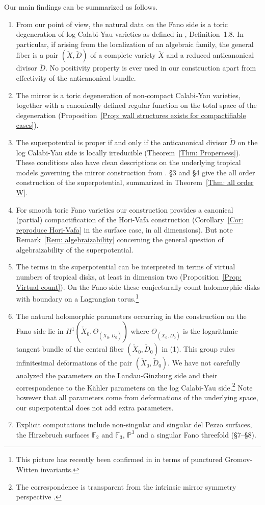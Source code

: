 \documentclass[11pt,letter]{amsart}
\theoremstyle{definition}
\theoremstyle{remark}
\numberwithin{equation}{section}
\numberwithin{figure}{section}
\newcommand{\FF} {\mathbb{F}}
\newcommand{\PP} {\mathbb{P}}
\begin{document}
Our main findings can be summarized as follows.
\begin{enumerate}
\item
From our point of view, the natural data on the Fano side is a toric degeneration
of log Calabi-Yau varieties as defined in \cite{affinecomplex}, Definition~1.8. In
particular, if arising from the localization of an algebraic family, the general
fiber is a pair $(\check X,\check D)$ of a complete variety $\check X$ and a
reduced anticanonical divisor $\check D$. No positivity property is ever used
in our construction apart from effectivity of the anticanonical bundle.
\item
The mirror is a toric degeneration of non-compact Calabi-Yau varieties, together
with a canonically defined regular function on the total space of the
degeneration (Proposition~\ref{Prop: wall structures exists for compactifiable cases}).
\item
The superpotential is proper if and only if the anticanonical divisor $\check D$
on the log Calabi-Yau side is locally irreducible (Theorem~\ref{Thm:
Properness}). These conditions also have clean descriptions on the underlying
tropical models governing the mirror construction from
\cite{logmirror,affinecomplex}. \S3 and \S4 give the all order construction of the superpotential, summarized in Theorem~\ref{Thm: all order W}.
\item
For smooth toric Fano varieties our construction provides a canonical (partial)
compactification of the Hori-Vafa construction \cite{HoriVafa}
(Corollary~\ref{Cor: reproduce Hori-Vafa} in the surface case,
\cite[Thm.\,5.4]{MaxThesis} in all dimensions). But note Remark~\ref{Rem:
algebraizability} concerning the general question of algebraizability of the
superpotential.
\item
The terms in the superpotential can be interpreted in terms of virtual numbers
of tropical disks, at least in dimension two (Proposition~\ref{Prop: Virtual
count}). On the Fano side these conjecturally count holomorphic disks with
boundary on a Lagrangian torus.\footnote{This picture has recently been
confirmed in \cite{CanonicalWalls} in terms of punctured Gromov-Witten
invariants.}
\item
The natural holomorphic parameters occurring in the construction on the Fano
side lie in $H^1(\check X_0,\Theta_{(\check X_0,\check D_0)})$ where
$\Theta_{(\check X_0,\check D_0)}$ is the logarithmic tangent bundle of the
central fiber $(\check X_0,\check D_0)$ in (1). This group rules infinitesimal
deformations of the pair $(\check X_0,\check D_0)$. We have not carefully
analyzed the parameters on the Landau-Ginzburg side and their correspondence to
the K\"ahler parameters on the log Calabi-Yau side.\footnote{The correspondence
is transparent from the intrinsic mirror symmetry perspective
\cite{Assoc,CanonicalWalls}. } Note however that all parameters come from
deformations of the underlying space, our superpotential does not add extra
parameters.
\item
Explicit computations include non-singular and singular del Pezzo surfaces, the
Hirzebruch surfaces $\FF_2$ and $\FF_3$, $\PP^3$ and a singular Fano
threefold (\S7--\S8).
\end{enumerate}
\end{document}
